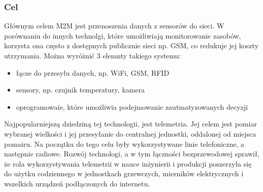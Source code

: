 \subsubsection{Cel}
\hspace{1cm}Głównym celem M2M jest przenoszenia danych z sensorów do sieci. W porównaniu do innych technolgi, które umożliwiają monitorowanie zasobów, korzysta ona często z dostępnych publicznie sieci np. GSM, co redukuje jej koszty utrzymania. Można wyróżnić 3 elemnty takiego systemu:
\begin{itemize}
  \item łącze do przesyłu danych, np. WiFi, GSM, RFID
  \item sensory, np. czujnik temperatury, kamera
  \item oprogramowaie, które umożliwia podejmowanie zautmatyzowanych decyzji
\end{itemize}
\hspace{1cm}Najpopularniejszą dziedziną tej technologii, jest telemetria. Jej celem jest pomiar wybranej wielkości i jej przesyłanie do centralnej jednostki, oddalonej od miejsca pomairu. Na początku do tego celu były wykorzystywane linie telefoniczne, a następnie radiowe. Rozwój technologi, a w tym łączności bezprzewodowej sprawił, że rola wykorzystywania telemetrii w nauce inżynierii i produkcji poszerzyła się do użytku codziennego w jednostkach grzewczych, mierników elektrycznych i wszelkich urządzeń podłączonych do internetu.\cite{m2m-web}

